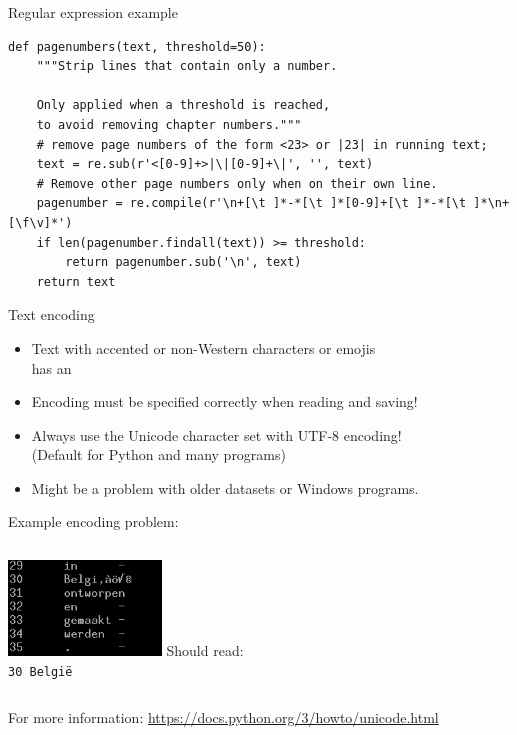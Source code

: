 \documentclass[aspectratio=169,usenames,dvipsnames]{beamer}
\begin{document}
\begin{frame}[fragile]{Regular expression example}
\begin{lstlisting}
def pagenumbers(text, threshold=50):
    """Strip lines that contain only a number.

    Only applied when a threshold is reached,
    to avoid removing chapter numbers."""
    # remove page numbers of the form <23> or |23| in running text;
    text = re.sub(r'<[0-9]+>|\|[0-9]+\|', '', text)
    # Remove other page numbers only when on their own line.
    pagenumber = re.compile(r'\n+[\t ]*-*[\t ]*[0-9]+[\t ]*-*[\t ]*\n+[\f\v]*')
    if len(pagenumber.findall(text)) >= threshold:
        return pagenumber.sub('\n', text)
    return text
\end{lstlisting}
\end{frame}

\begin{frame}{Text encoding}
    \begin{itemize}
        \item Text with accented or non-Western characters or emojis \\
            has an 
        \item Encoding must be specified correctly when reading and saving!
        \item Always use the Unicode character set with UTF-8 encoding! \\
            (Default for Python and many programs)
        \item Might be a problem with older datasets or Windows programs.
    \end{itemize}
  
    Example encoding problem:

    \begin{columns}
    \centering
         \includegraphics[width=0.5\textwidth]{fig/encodingissue}
        Should read:\\
        \texttt{30   Belgi\"e}
        \vspace{3em}
    \end{columns}

    \vspace{1em}
    For more information: \url{https://docs.python.org/3/howto/unicode.html}
\end{frame}
\end{document}
